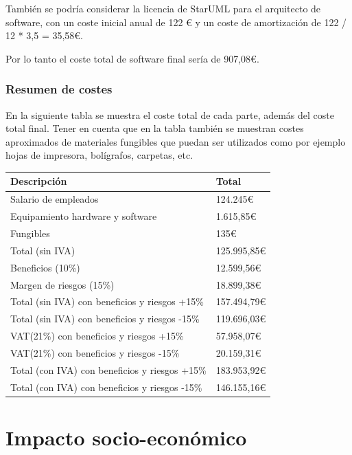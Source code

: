 \documentclass[12pt]{report} %
\begin{document}
También se podría considerar la licencia de StarUML para el arquitecto de software, con un coste inicial anual de 122 € y un coste de amortización de 122 / 12 * 3,5 = 35,58€.

Por lo tanto el coste total de software final sería de 907,08€.

\subsubsection{Resumen de costes}

En la siguiente tabla se muestra el coste total de cada parte, además del coste total final. Tener en cuenta que en la tabla también se muestran costes aproximados de materiales fungibles que puedan ser utilizados como por ejemplo hojas de impresora, bolígrafos, carpetas, etc.

\begin{table}[H]
	{
	  \begin{tabular}{|P{9cm}|P{4cm}|}
		\hline
		{\textbf{Descripción}} & {\textbf{Total}} \\
		\hline
		Salario de empleados & 124.245€ \\
		\hline
		Equipamiento hardware y software & 1.615,85€ \\
		\hline
		Fungibles & 135€ \\
		\hline
		Total (sin IVA) & 125.995,85€ \\
		\hline
		Beneficios (10\%) & 12.599,56€ \\
		\hline
		Margen de riesgos (15\%) & 18.899,38€ \\
		\hline
		Total (sin IVA) con beneficios y riesgos +15\% & 157.494,79€ \\
		\hline
		Total (sin IVA) con beneficios y riesgos -15\% & 119.696,03€ \\
		\hline
		VAT(21\%) con beneficios y riesgos +15\% & 57.958,07€ \\
		\hline
		VAT(21\%) con beneficios y riesgos -15\% & 20.159,31€ \\
		\hline
		Total (con IVA) con beneficios y riesgos +15\% & 183.953,92€ \\
		\hline
		Total (con IVA) con beneficios y riesgos -15\% & 146.155,16€ \\
		\hline
	  \end{tabular}
	}
\end{table}

\section{Impacto socio-económico}
\end{document}
